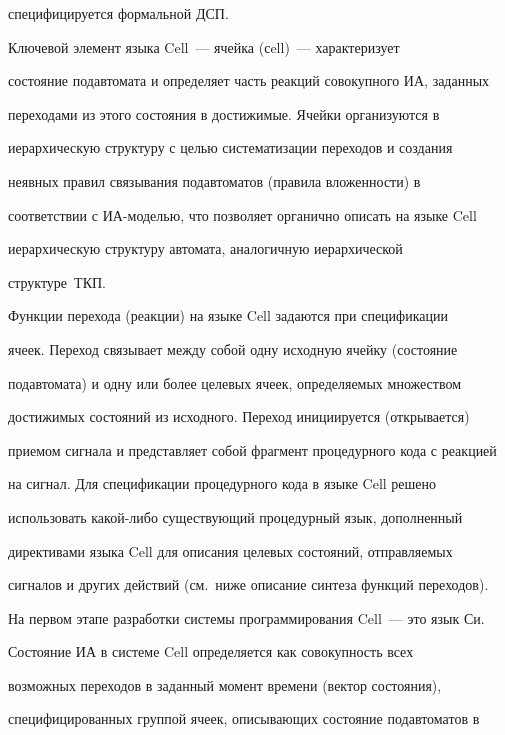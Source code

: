 специфицируется формальной ДСП.


      


      Ключевой элемент языка Cell~--- ячейка (сell)~--- характеризует 


состояние подавтомата и определяет часть реакций совокупного ИА, заданных 


переходами из этого состояния в достижимые. Ячейки организуются в 


иерархическую структуру с целью систематизации переходов и создания 


неявных правил связывания подавтоматов (правила вложенности) в 


соответствии с ИА-мо\-делью, что позволяет органично описать на языке Cell 


иерархическую структуру автомата, аналогичную иерархической 


структуре~ТКП.


      


      Функции перехода (реакции) на языке Cell задаются при спецификации 


ячеек. Переход связывает между собой одну исходную ячейку (состояние 


подавтомата) и одну или более целевых ячеек, определяемых множеством 


достижимых состояний из исходного. Переход инициируется (открывается) 


приемом сигнала и представляет собой фрагмент процедурного кода с реакцией 


на сигнал. Для спецификации процедурного кода в языке Cell решено 


использовать ка\-кой-ли\-бо существующий процедурный язык, дополненный 


директивами языка Cell для описания целевых состояний, отправляемых 


сигналов и других действий (см.\ ниже описание синтеза функций переходов). 


На первом этапе разработки системы программирования Cell~--- это язык Си.


      


      Состояние ИА в системе Cell определяется как совокупность всех 


возможных переходов в заданный момент времени (вектор состояния), 


специфицированных группой ячеек, описывающих состояние подавтоматов в 


